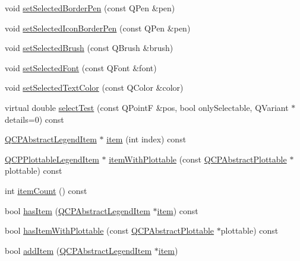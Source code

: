 \begin{DoxyCompactItemize}
\item 
void \hyperlink{class_q_c_p_legend_a2c35d262953a25d96b6112653fbefc88}{set\+Selected\+Border\+Pen} (const Q\+Pen \&pen)
\item 
void \hyperlink{class_q_c_p_legend_ade93aabe9bcccaf9cf46cec22c658027}{set\+Selected\+Icon\+Border\+Pen} (const Q\+Pen \&pen)
\item 
void \hyperlink{class_q_c_p_legend_a875227f3219c9799464631dec5e8f1bd}{set\+Selected\+Brush} (const Q\+Brush \&brush)
\item 
void \hyperlink{class_q_c_p_legend_ab580a01c3c0a239374ed66c29edf5ad2}{set\+Selected\+Font} (const Q\+Font \&font)
\item 
void \hyperlink{class_q_c_p_legend_a7674dfc7a1f30e1abd1018c0ed45e0bc}{set\+Selected\+Text\+Color} (const Q\+Color \&color)
\item 
virtual double \hyperlink{class_q_c_p_legend_acd7be544c81324e391cfa6be9c413c01}{select\+Test} (const Q\+PointF \&pos, bool only\+Selectable, Q\+Variant $\ast$details=0) const
\item 
\hyperlink{class_q_c_p_abstract_legend_item}{Q\+C\+P\+Abstract\+Legend\+Item} $\ast$ \hyperlink{class_q_c_p_legend_acfe9694c45104a3359d3806ed366fcf7}{item} (int index) const
\item 
\hyperlink{class_q_c_p_plottable_legend_item}{Q\+C\+P\+Plottable\+Legend\+Item} $\ast$ \hyperlink{class_q_c_p_legend_a91e790002d8bf15a20628a8e8841e397}{item\+With\+Plottable} (const \hyperlink{class_q_c_p_abstract_plottable}{Q\+C\+P\+Abstract\+Plottable} $\ast$plottable) const
\item 
int \hyperlink{class_q_c_p_legend_a57ab86ab8b2a3762d4c1455eb5452c88}{item\+Count} () const
\item 
bool \hyperlink{class_q_c_p_legend_ad0f698e33db454a6c103b5206740e599}{has\+Item} (\hyperlink{class_q_c_p_abstract_legend_item}{Q\+C\+P\+Abstract\+Legend\+Item} $\ast$\hyperlink{class_q_c_p_legend_acfe9694c45104a3359d3806ed366fcf7}{item}) const
\item 
bool \hyperlink{class_q_c_p_legend_a4b90a442af871582df85c2bc13f91e88}{has\+Item\+With\+Plottable} (const \hyperlink{class_q_c_p_abstract_plottable}{Q\+C\+P\+Abstract\+Plottable} $\ast$plottable) const
\item 
bool \hyperlink{class_q_c_p_legend_a3ab274de52d2951faea45a6d975e6b3f}{add\+Item} (\hyperlink{class_q_c_p_abstract_legend_item}{Q\+C\+P\+Abstract\+Legend\+Item} $\ast$\hyperlink{class_q_c_p_legend_acfe9694c45104a3359d3806ed366fcf7}{item})
\item 

\end{DoxyCompactItemize}
